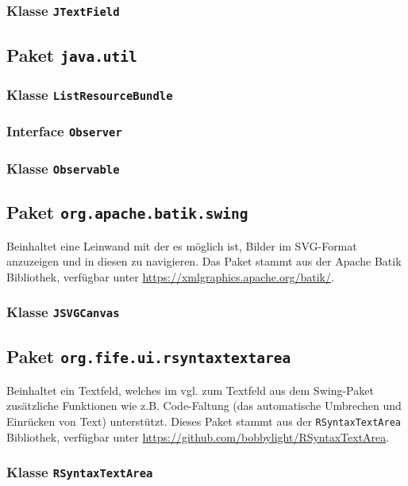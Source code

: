 \documentclass[parskip=full,11pt,twoside]{scrartcl}
\begin{document}
\subsubsection{Klasse \texttt{JTextField}}

\subsection{Paket \texttt{java.util}}

\subsubsection{Klasse \texttt{ListResourceBundle}}

\subsubsection{Interface \texttt{Observer}}

\subsubsection{Klasse \texttt{Observable}}

\subsection{Paket \texttt{org.apache.batik.swing}}

Beinhaltet eine Leinwand mit der es möglich ist, Bilder im SVG-Format anzuzeigen und in diesen zu navigieren. Das Paket stammt aus der Apache Batik Bibliothek, verfügbar unter \url{https://xmlgraphics.apache.org/batik/}.

\subsubsection{Klasse \texttt{JSVGCanvas}}

\subsection{Paket \texttt{org.fife.ui.rsyntaxtextarea}}

Beinhaltet ein Textfeld, welches im vgl. zum Textfeld aus dem Swing-Paket zusätzliche Funktionen wie z.B. Code-Faltung (das automatische Umbrechen und Einrücken von Text) unterstützt. Dieses Paket stammt aus der \texttt{RSyntaxTextArea} Bibliothek, verfügbar unter \url{https://github.com/bobbylight/RSyntaxTextArea}.

\subsubsection{Klasse \texttt{RSyntaxTextArea}}
\end{document}

